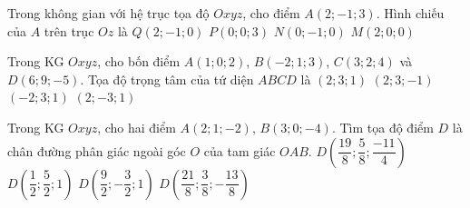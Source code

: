 \begin{ex}%
	Trong không gian với hệ trục tọa độ $Oxyz$, cho điểm $A(2;-1;3)$. Hình chiếu của $A$ trên trục $Oz$ là
	\choice
	{$Q(2;-1;0)$}
	{\True $P(0;0;3)$}
	{$N(0;-1;0)$}
	{$M(2;0;0)$}
\end{ex}
\begin{ex}%
	Trong KG $Oxyz$, cho bốn điểm $A(1;0;2)$, $B(-2;1;3)$, $C(3;2;4)$ và $D(6;9;-5)$. Tọa độ trọng tâm của tứ diện $ABCD$ là
	\choice
	{\True $(2;3;1)$}
	{$(2;3;-1)$}
	{$(-2;3;1)$}
	{$(2;-3;1)$}
\end{ex}
\begin{ex}%
	Trong KG $Oxyz$, cho hai điểm $A(2;1;-2)$, $B(3;0;-4)$. Tìm tọa độ điểm $D$ là chân đường phân giác ngoài góc $O$ của tam giác $OAB$.
	\choice
	{$D\left(\dfrac{19}{8};\dfrac{5}{8};\dfrac{-11}{4}\right)$}
	{\True $D\left(\dfrac{1}{2};\dfrac{5}{2};1\right)$}
	{$D\left(\dfrac{9}{2};-\dfrac{3}{2};1\right)$}
	{$D\left(\dfrac{21}{8};\dfrac{3}{8};-\dfrac{13}{8}\right)$}
\end{ex}
